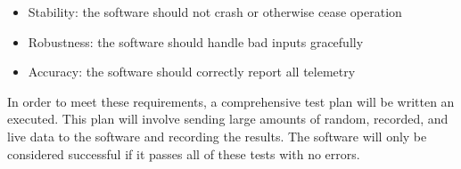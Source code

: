 \documentclass[10pt,journal,draftclsnofoot,onecolumn]{IEEEtran}
\begin{document}
	\begin{itemize}
		\item Stability: the software should not crash or otherwise cease operation
		\item Robustness: the software should handle bad inputs gracefully
		\item Accuracy: the software should correctly report all telemetry
	\end{itemize}
	
	In order to meet these requirements, a comprehensive test plan will
	be written an executed. This plan will involve sending large amounts
	of random, recorded, and live data to the software and recording the results.
	The software will only be considered successful if it passes all of these
	tests with no errors.
	
\end{document}
